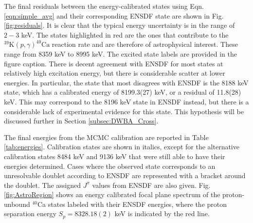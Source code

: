 The final residuals between the energy-calibrated states using Eqn. \ref{eqn:simple_avg} and their corresponding ENSDF state are shown in Fig. \ref{fig:residuals}. It is clear that the typical energy uncertainty is in the range of $2-3$ keV. The states highlighted in red are the ones that contribute to the $^{39}\mathrm{K}(p,\gamma)^{40}\mathrm{Ca}$ reaction rate and are therefore of astrophysical interest. These range from 8359 keV to 8995 keV. The excited state labels are provided in the figure caption. There is decent agreement with ENSDF for most states at relatively high excitation energy, but there is considerable scatter at lower energies. In particular, the state that most disagrees with ENSDF is the 8188 keV state, which has a calibrated energy of 8199.3(27) keV, or a residual of 11.8(28) keV. This may correspond to the 8196 keV state in ENSDF instead, but there is a considerable lack of experimental evidence for this state. This hypothesis will be discussed further in Section \ref{subsec:DWBA_Cross}.

The final energies from the MCMC calibration are reported in Table \ref{tab:energies}. Calibration states are shown in italics, except for the alternative calibration states 8484 keV and 9136 keV that were still able to have their energies determined. Cases where the observed state corresponds to an unresolvable doublet according to ENSDF are represented with a bracket around the doublet. The assigned $J^{\pi}$ values from ENSDF are also given. Fig. \ref{fig:AstroRegion} shows an energy calibrated focal plane spectrum of the proton-unbound $^{40}$Ca states labeled with their ENSDF \cite{Chen2017} energies, where the proton separation energy $S_{p} = 8328.18(2)$ keV \cite{Wang2021} is indicated by the red line.

\newpage

